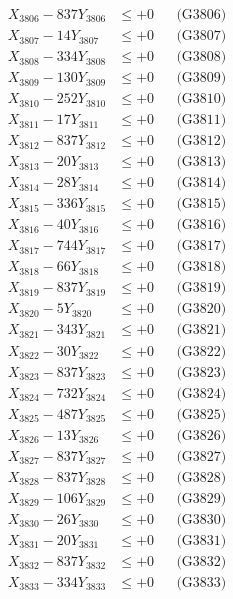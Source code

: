 \documentclass[a4paper,10pt]{article}
\begin{document}
{\begin{align}
X_{3806} - 837Y_{3806} &\leq +0 && \text{(G3806)} \\
X_{3807} - 14Y_{3807} &\leq +0 && \text{(G3807)} \\
X_{3808} - 334Y_{3808} &\leq +0 && \text{(G3808)} \\
X_{3809} - 130Y_{3809} &\leq +0 && \text{(G3809)} \\
X_{3810} - 252Y_{3810} &\leq +0 && \text{(G3810)} \\
\allowbreak
X_{3811} - 17Y_{3811} &\leq +0 && \text{(G3811)} \\
X_{3812} - 837Y_{3812} &\leq +0 && \text{(G3812)} \\
X_{3813} - 20Y_{3813} &\leq +0 && \text{(G3813)} \\
X_{3814} - 28Y_{3814} &\leq +0 && \text{(G3814)} \\
X_{3815} - 336Y_{3815} &\leq +0 && \text{(G3815)} \\
X_{3816} - 40Y_{3816} &\leq +0 && \text{(G3816)} \\
X_{3817} - 744Y_{3817} &\leq +0 && \text{(G3817)} \\
X_{3818} - 66Y_{3818} &\leq +0 && \text{(G3818)} \\
X_{3819} - 837Y_{3819} &\leq +0 && \text{(G3819)} \\
X_{3820} - 5Y_{3820} &\leq +0 && \text{(G3820)} \\
\allowbreak
X_{3821} - 343Y_{3821} &\leq +0 && \text{(G3821)} \\
X_{3822} - 30Y_{3822} &\leq +0 && \text{(G3822)} \\
X_{3823} - 837Y_{3823} &\leq +0 && \text{(G3823)} \\
X_{3824} - 732Y_{3824} &\leq +0 && \text{(G3824)} \\
X_{3825} - 487Y_{3825} &\leq +0 && \text{(G3825)} \\
X_{3826} - 13Y_{3826} &\leq +0 && \text{(G3826)} \\
X_{3827} - 837Y_{3827} &\leq +0 && \text{(G3827)} \\
X_{3828} - 837Y_{3828} &\leq +0 && \text{(G3828)} \\
X_{3829} - 106Y_{3829} &\leq +0 && \text{(G3829)} \\
X_{3830} - 26Y_{3830} &\leq +0 && \text{(G3830)} \\
\allowbreak
X_{3831} - 20Y_{3831} &\leq +0 && \text{(G3831)} \\
X_{3832} - 837Y_{3832} &\leq +0 && \text{(G3832)} \\
X_{3833} - 334Y_{3833} &\leq +0 && \text{(G3833)} \\

\end{align}}
\end{document}
